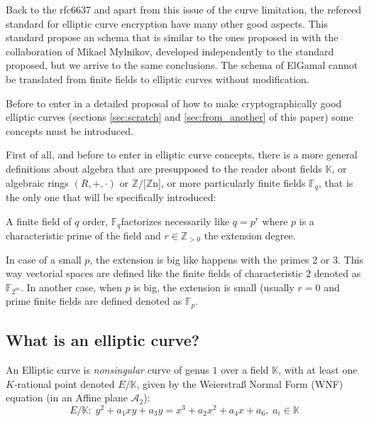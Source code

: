 \documentclass[10pt,a4paper,twoside]{llncs}
\newcommand{\A}{\ensuremath{\mathcal{A}_{2}}}%
\newcommand{\K}{\ensuremath{\mathbb{K}}}%
\newcommand{\Fp}{\ensuremath{\mathbb{F}_p}}%
\newcommand{\Fm}{\ensuremath{\mathbb{F}_{2^m}}}%
\newcommand{\Fq}{\ensuremath{\mathbb{F}_q}}%
\newcommand{\Zn}[1]{\ensuremath{\mathbb{Z}/#1\mathbb{Z}}}%
\begin{document}
Back to the rfc6637 \cite{rfc6637} and apart from this issue of the curve limitation, the refereed standard for elliptic curve encryption have many other good aspects. This standard propose an schema that is similar to the ones proposed in \cite{BM06} with the collaboration of Mikael Mylnikov, developed independently to the standard proposed, but we arrive to the same conclusions. The schema of ElGamal cannot be translated from finite fields to elliptic curves without modification.

Before to enter in a detailed proposal of how to make cryptographically good elliptic curves (sections \ref{sec:scratch} and \ref{sec:from_another} of this paper) some concepts must be introduced. 

First of all, and before to enter in elliptic curve concepts, there is a more general definitions about algebra that are presupposed to the reader about fields \K, or algebraic rings $(R,+,\cdot)$ or \Zn[n], or more particularly finite fields \Fq, that is the only one that will be specifically introduced:

\begin{definition}\label{def:cf}
 A finite field of $q$ order, \Fq \;factorizes necessarily like $q=p^r$ where $p$ is a characteristic prime of the field and $r \in \mathbb{Z}_{>0}$ the extension degree.
\end{definition}

In case of a small $p$, the extension is big like happens with the primes $2$ or $3$. This way vectorial spaces are defined like the finite fields of characteristic $2$ denoted as \Fm. In another case, when $p$ is big, the extension is small (usually $r=0$ and prime finite fields are defined denoted as \Fp.

\subsection{What is an elliptic curve? \label{sec:ce}}


\begin{definition}\label{def:ce}
An Elliptic curve is \emph{nonsingular} curve of genus $1$ over a field $\mathbb{K}$, with at least one $K$-rational point denoted $E/\mathbb{K}$, given by the Weierstra\ss{} Normal Form (WNF) equation (in an Affine plane \A):
\begin{equation}\label{eq:WNF}
E/\mathbb{K}:\; y^{2} + a_{1}xy + a_{3}y = x^{3} + a_{2}x^{2} + a_{4}x + a_{6},\; a_{i} \in \mathbb{K}
\end{equation}
\end{definition}
\end{document}
